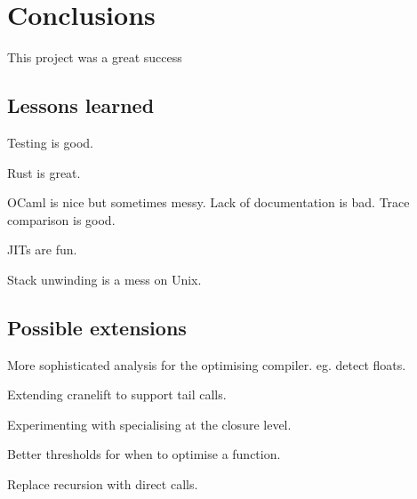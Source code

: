 \chapter{Conclusions}

This project was a great success

\section{Lessons learned}

Testing is good.

Rust is great.

OCaml is nice but sometimes messy. Lack of documentation is bad. Trace comparison is good.

JITs are fun.

Stack unwinding is a mess on Unix.

\section{Possible extensions}

More sophisticated analysis for the optimising compiler. eg. detect floats.

Extending cranelift to support tail calls.

Experimenting with specialising at the closure level.

Better thresholds for when to optimise a function.

Replace recursion with direct calls.